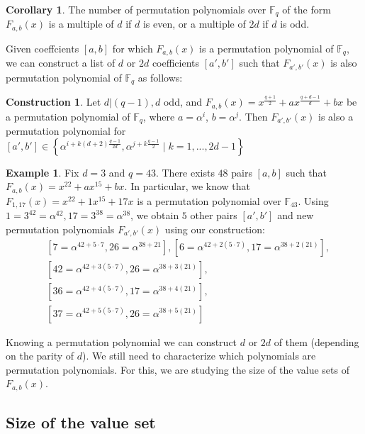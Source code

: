 \documentclass{article}
\theoremstyle{definition}
\newtheorem{corollary}[theorem]{Corollary}
\newtheorem{example}[theorem]{Example}
\newtheorem{construction}[theorem]{Construction}
\theoremstyle{remark}
\numberwithin{equation}{section}
\begin{document}
    \begin{corollary}
          The number of permutation polynomials  over $\mathbb{F}_{q}$ of the form $F_{a,b}(x)$ is a multiple of $d$ if $d$ is even, or a multiple of $2d$ if $d$ is odd.
    \end{corollary}

    Given coeffcients $[a,b]$ for which $F_{a,b}(x)$ is a permutation polynomial of $\mathbb{F}_q$, we can construct a list of $d$ or $2d$ coefficients $[a',b']$ such that $F_{a',b'}(x)$ is also permutation polynomial of $\mathbb{F}_q$ as follows:


\begin{construction} Let $d|(q-1), d$ odd, and $F_{a,b}(x) = x^{\frac{q+1}{2}} + a x^{\frac{q+d-1}{d}} + b x$ be a permutation polynomial of $\mathbb{F}_{q}$, where $a=\alpha^i$, $b=\alpha^j$. Then $F_{a',b'}(x)$ is also a permutation polynomial for $[a',b'] \in \left\{ \alpha^{i+k (d+2) \frac{q-1}{2d}}, \alpha^{j+k \frac{q-1}{2}} \mid k=1,...,2d-1 \right\}$
\end{construction}

    \begin{example}
      Fix $d = 3$ and $q = 43$. There exists $48$ pairs $[a,b]$ such that $F_{a,b}(x) = x^{22} + a x^{15} + b x$. In particular, we know that $F_{1,17}(x) = x^{22} + 1 x^{15} + 17 x$  is a permutation polynomial over $\mathbb{F}_{43}$. Using $1=3^{42}=\alpha^{42}, 17= 3^{38}=\alpha^{38}$, we obtain $5$ other pairs $[a', b']$ and new permutation polynomials $F_{a',b'}(x)$ using our construction:
      \begin{align*}
        &[7=\alpha^{42+5\cdot 7},26=\alpha^{38+21}], [6=\alpha^{42+2(5\cdot 7)},17=\alpha^{38+2(21)}], \\
        &[42=\alpha^{42+3(5\cdot 7)},26=\alpha^{38+3(21)}], \\
        &[36=\alpha^{42+4(5\cdot 7)},17=\alpha^{38+4(21)}], \\ 
        &[37=\alpha^{42+5(5\cdot 7)},26=\alpha^{38+5(21)}]
      \end{align*}
    \end{example}

Knowing a permutation polynomial we can construct $d$ or $2d$ of them (depending on the parity of $d$). We still need to characterize which polynomials are permutation polynomials. For this,  we are studying the size of the value sets of $F_{a,b}(x)$. 

\subsection{Size of the value set}
\end{document}
